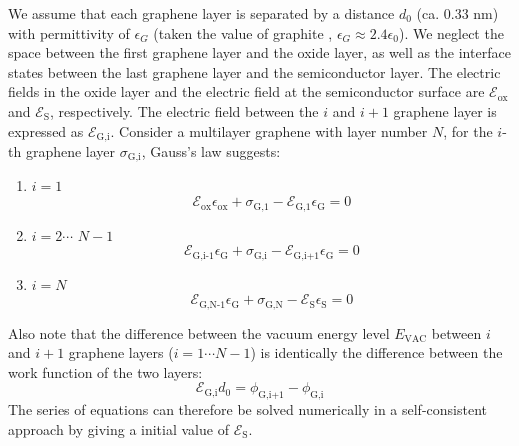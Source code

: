 \documentclass[manuscript=suppinfo]{achemso}
\newcommand*\subs[1]{_{\text{#1}}} %
\newcommand*\E[1]{\mathscr{E}\subs{#1}}
\begin{document}
We assume that each graphene layer is separated by a distance $d_0$ (ca. 0.33 nm) with permittivity of $\epsilon_G$ (taken the value of graphite \cite{Lui2011, Regan2012ScreeningEngineered}, $\epsilon_G\approx2.4\epsilon_0$).
We neglect the space between the first graphene layer and the oxide layer, as well as the interface states between the last graphene layer and the semiconductor layer.
The electric fields in the oxide layer and the electric field at the semiconductor surface are $\E{ox}$ and $\E{S}$, respectively.
The electric field between the $i$ and $i+1$ graphene layer is expressed as $\E{G,i}$.
Consider a multilayer graphene with layer number $N$, for the $i$-th graphene layer $\sigma\subs{G,i}$, Gauss's law suggests: 
\begin{enumerate}
  \item $i=1$\\
    \begin{equation}
      \E{ox}\epsilon\subs{ox} + \sigma\subs{G,1} - \E{G,1}\epsilon\subs{G} = 0
    \end{equation} 
  \item $i=2$$\cdots$ $N-1$\\
    \begin{equation}
      \E{G,i-1}\epsilon\subs{G} + \sigma\subs{G,i} - \E{G,i+1}\epsilon\subs{G} = 0
    \end{equation}  
  \item $i=N$\\
    \begin{equation}
      \E{G,N-1}\epsilon\subs{G} + \sigma\subs{G,N} - \E{S}\epsilon\subs{S} = 0
    \end{equation}
\end{enumerate}
Also note that the difference between the vacuum energy level $E\subs{VAC}$ between $i$ and $i+1$ graphene layers ($i=1\cdots N-1$) is identically the difference between the work function of the two layers:
\begin{equation}
  \E{G,i}d_0 = \phi\subs{G,i+1} - \phi\subs{G,i}
\end{equation}
The series of equations can therefore be solved numerically in a self-consistent approach by giving a initial value of $\E{S}$.
\end{document}

